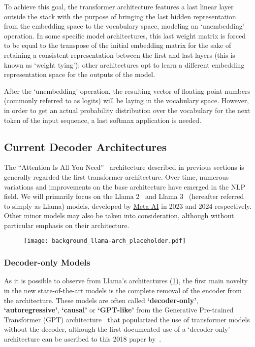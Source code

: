 To achieve this goal, the transformer architecture features a last linear layer outside the stack with the purpose of bringing the last hidden representation from the embedding space to the vocabulary space, modeling an `unembedding' operation.
In some specific model architectures, this last weight matrix is forced to be equal to the transpose of the initial embedding matrix for the sake of retaining a consistent representation between the first and last layers (this is known as `weight tying'); other architectures opt to learn a different embedding representation space for the outputs of the model.

After the `unembedding' operation, the resulting vector of floating point numbers (commonly referred to as logits) will be laying in the vocabulary space.
However, in order to get an actual probability distribution over the vocabulary for the next token of the input sequence, a last softmax application is needed.

\subsection{Current Decoder Architectures}\label{ssec:background_transf_current}

The ``Attention Is All You Need''~\cite{vaswani2017} architecture described in previous sections is generally regarded the first transformer architecture.
Over time, numerous variations and improvements on the base architecture have emerged in the NLP field.
We will primarily focus on the Llama 2~\cite{touvron2023} and Llama 3~\cite{dubey2024} (hereafter referred to simply as Llama) models, developed by \href{https://ai.meta.com/}{Meta AI} in 2023 and 2024 respectively.
Other minor models may also be taken into consideration, although without particular emphasis on their architecture.

\begin{figure}[t!]
    \centering
    \texttt{[image: background\_llama-arch\_placeholder.pdf]}
    \caption{}
    \label{fig:background_llama-arch}
\end{figure}

\subsubsection*{Decoder-only Models}

As it is possible to observe from Llama's architectures (\cref{fig:background_llama-arch}), the first main novelty in the new state-of-the-art models is the complete removal of the encoder from the architecture.
These models are often called \textbf{`decoder-only'}, \textbf{`autoregressive'}, \textbf{`causal'} or \textbf{`GPT-like'} from the Generative Pre-trained Transformer (GPT) architecture~\cite{radford2018,radford2019,brown2020,openai2023} that popularized the use of transformer models without the decoder, although the first documented use of a `decoder-only' architecture can be ascribed to this 2018 paper by~\citet{liu2018}.


